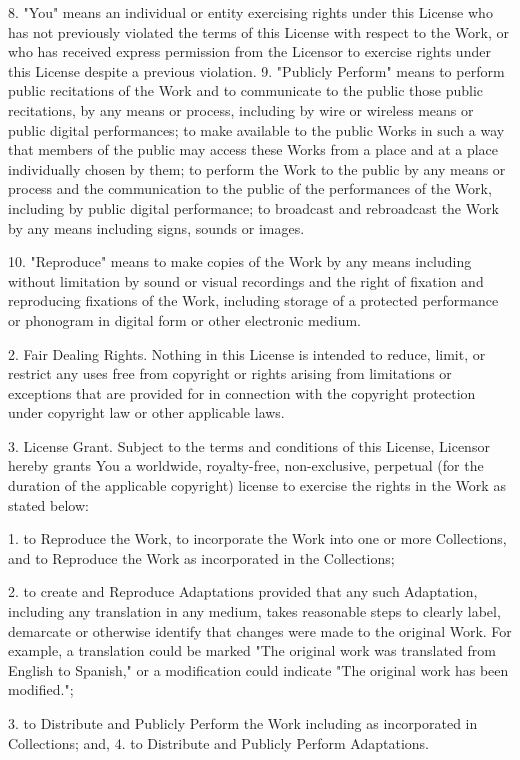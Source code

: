 8. "You" means an individual or entity exercising rights under this
License who has not previously violated the terms of this License
with respect to the Work, or who has received express permission
from the Licensor to exercise rights under this License despite a
previous violation. 9. "Publicly Perform" means to perform public
recitations of the Work and to communicate to the public those
public recitations, by any means or process, including by wire or
wireless means or public digital performances; to make available to
the public Works in such a way that members of the public may
access these Works from a place and at a place individually chosen
by them; to perform the Work to the public by any means or process
and the communication to the public of the performances of the
Work, including by public digital performance; to broadcast and
rebroadcast the Work by any means including signs, sounds or
images.

10. "Reproduce" means to make copies of the Work by any means
including without limitation by sound or visual recordings and the
right of fixation and reproducing fixations of the Work, including
storage of a protected performance or phonogram in digital form or
other electronic medium.

2. Fair Dealing Rights. Nothing in this License is intended to
reduce, limit, or restrict any uses free from copyright or rights
arising from limitations or exceptions that are provided for in
connection with the copyright protection under copyright law or
other applicable laws.

3. License Grant. Subject to the terms and conditions of this
License, Licensor hereby grants You a worldwide, royalty-free,
non-exclusive, perpetual (for the duration of the applicable
copyright) license to exercise the rights in the Work as stated
below:

1. to Reproduce the Work, to incorporate the Work into one or more
Collections, and to Reproduce the Work as incorporated in the
Collections;

2. to create and Reproduce Adaptations provided that any such
Adaptation, including any translation in any medium, takes
reasonable steps to clearly label, demarcate or otherwise identify
that changes were made to the original Work. For example, a
translation could be marked "The original work was translated from
English to Spanish," or a modification could indicate "The original
work has been modified.";

3. to Distribute and Publicly Perform the Work including as
incorporated in Collections; and, 4. to Distribute and Publicly
Perform Adaptations.

